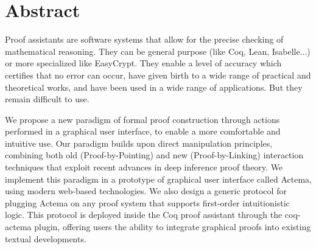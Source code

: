 


\maketitle


\chapter*{Abstract}

Proof assistants are software systems that allow for the precise checking of
mathematical reasoning. They can be general purpose (like Coq, Lean,
Isabelle...) or more specialized like EasyCrypt. They enable a level of accuracy
which certifies that no error can occur, have given birth to a wide range of
practical and theoretical works, and have been used in a wide range of
applications. But they remain difficult to use.

We propose a new paradigm of formal proof construction through actions performed
in a graphical user interface, to enable a more comfortable and intuitive use.
Our paradigm builds upon direct manipulation principles, combining both old
(Proof-by-Pointing) and new (Proof-by-Linking) interaction techniques that
exploit recent advances in deep inference proof theory. We implement this
paradigm in a prototype of graphical user interface called Actema, using modern
web-based technologies. We also design a generic protocol for plugging Actema on
any proof system that supports first-order intuitionistic logic. This protocol
is deployed inside the Coq proof assistant through the coq-actema plugin,
offering users the ability to integrate graphical proofs into existing textual
developments.

